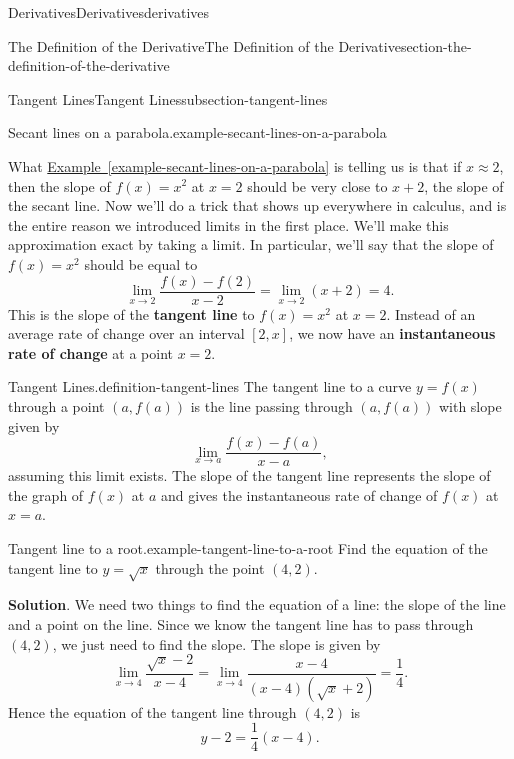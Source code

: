 \documentclass[oneside,10pt,]{book}
\newcommand{\terminology}[1]{\textbf{#1}}
\numberwithin{equation}{section}
\begin{document}
\begin{chapterptx}{Derivatives}{}{Derivatives}{}{}{derivatives}
\begin{sectionptx}{The Definition of the Derivative}{}{The Definition of the Derivative}{}{}{section-the-definition-of-the-derivative}
\begin{subsectionptx}{Tangent Lines}{}{Tangent Lines}{}{}{subsection-tangent-lines}
\begin{example}{Secant lines on a parabola.}{example-secant-lines-on-a-parabola}
%
\end{example}
\hypertarget{p-78}{}%
What \hyperref[example-secant-lines-on-a-parabola]{Example~\ref{example-secant-lines-on-a-parabola}} is telling us is that if \(x\approx2\), then the slope of \(f(x) = x^{2}\) at \(x=2\) should be very close to \(x+2\), the slope of the secant line. Now we'll do a trick that shows up everywhere in calculus, and is the entire reason we introduced limits in the first place. We'll make this approximation exact by taking a limit. In particular, we'll say that the slope of \(f(x) = x^{2}\) should be equal to%
\begin{equation*}
\lim_{x\to2}\frac{f(x)-f(2)}{x-2} = \lim_{x\to2}(x+2) = 4.
\end{equation*}
This is the slope of the \terminology{tangent line} to \(f(x) = x^{2}\) at \(x=2\). Instead of an average rate of change over an interval \([2,x]\), we now have an \terminology{instantaneous rate of change} at a point \(x=2\).%
\begin{definition}{Tangent Lines.}{definition-tangent-lines}%
\hypertarget{p-79}{}%
The tangent line to a curve \(y=f(x)\) through a point \((a,f(a))\) is the line passing through \((a,f(a))\) with slope given by%
\begin{equation*}
\lim_{x\to a}\frac{f(x)-f(a)}{x-a},
\end{equation*}
assuming this limit exists. The slope of the tangent line represents the slope of the graph of \(f(x)\) at \(a\) and gives the instantaneous rate of change of \(f(x)\) at \(x=a\).%
\end{definition}
\begin{example}{Tangent line to a root.}{example-tangent-line-to-a-root}%
\hypertarget{p-80}{}%
Find the equation of the tangent line to \(y=\sqrt{x}\) through the point \((4,2)\).%
\par\smallskip%
\noindent\textbf{Solution}.\hypertarget{solution-17}{}\quad%
\hypertarget{p-81}{}%
We need two things to find the equation of a line: the slope of the line and a point on the line. Since we know the tangent line has to pass through \((4,2)\), we just need to find the slope. The slope is given by%
\begin{equation*}
\lim_{x\to 4}\frac{\sqrt{x}-2}{x-4} = \lim_{x\to4}\frac{x-4}{(x-4)(\sqrt{x}+2)} = \frac{1}{4}.
\end{equation*}
Hence the equation of the tangent line through \((4,2)\) is%
\begin{equation*}
y-2 = \frac{1}{4}(x-4).
\end{equation*}

\end{example}
\end{subsectionptx}
\end{sectionptx}
\end{chapterptx}
\end{document}
